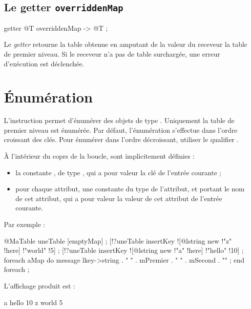 \subsection{Le getter \texttt{overriddenMap}}

\begin{galgascode}
getter @T overriddenMap -> @T ;
\end{galgascode}


Le \emph{getter}  retourne la table obtenue en amputant de la valeur du receveur la table de premier niveau. Si le receveur n'a pas de table surchargée, une erreur d'exécution est déclenchée.





\section{Énumération}

L'instruction  permet d'énumérer des objets de type . Uniquement la table de premier niveau est énumérée. Par défaut, l'énumération s'effectue dans l'ordre croissant des clés. Pour énumérer dans l'ordre décroissant, utiliser le qualifier \galgas{>}.

À l'intérieur du coprs de la boucle, sont implicitement définies :
\begin{itemize}
  \item la constante , de type , qui a pour valeur la clé de l'entrée courante ;
  \item pour chaque attribut, une constante du type de l'attribut, et portant le nom de cet attribut, qui a pour valeur la valeur de cet attribut de l'entrée courante.
\end{itemize}

Par exemple :
\begin{galgascode}
@MaTable uneTable [emptyMap] ;
[!?uneTable insertKey ![@lstring new !"z" !here] !"world" !5] ;
[!?uneTable insertKey ![@lstring new !"a" !here] !"hello" !10] ;
foreach aMap do
  message lkey->string . " " . mPremier . " " . mSecond . "\n" ;
end foreach ;
\end{galgascode}

L'affichage produit est :

\begin{galgascode}
a hello 10
z world 5
\end{galgascode}

